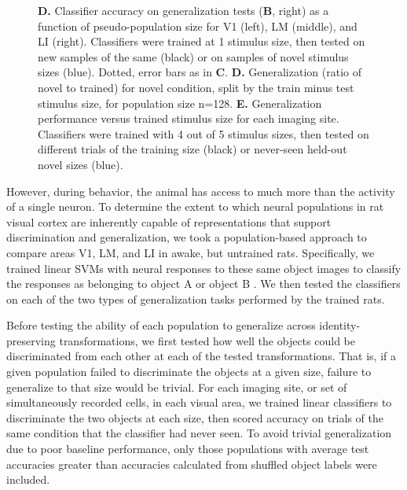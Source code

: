 \begin{figure}[t!]
{    \textbf{D.} Classifier accuracy on generalization tests (\textbf{B}, right) as a function of pseudo-population size for V1 (left), LM (middle), and LI (right). Classifiers were trained at 1 stimulus size, then tested on new samples of the same (black) or on samples of novel stimulus sizes (blue). Dotted, error bars as in \textbf{C}.
    \textbf{D.} Generalization (ratio of novel to trained) for novel condition, split by the train minus test stimulus size, for population size n=128.
    \textbf{E.} Generalization performance versus trained stimulus size for each imaging site. Classifiers were trained with 4 out of 5 stimulus sizes, then tested on different trials of the training size (black) or never-seen held-out novel sizes (blue).
    \label{fig:neural_generalization}}
\end{figure}


However, during behavior, the animal has access to much more than the activity of a single neuron. To determine the extent to which neural populations in rat visual cortex are inherently capable of representations that support discrimination and generalization, we took a population-based approach to compare areas V1, LM, and LI in awake, but untrained rats. Specifically, we trained linear SVMs with neural responses to these same object images to classify the responses as belonging to object A or object B \cite{Hung2005, Li2009, Rust2010}. We then tested the classifiers on each of the two types of generalization tasks performed by the trained rats. 

Before testing the ability of each population to generalize across identity-preserving transformations, we first tested how well the objects could be discriminated from each other at each of the tested transformations. That is, if a given population failed to discriminate the objects at a given size, failure to generalize to that size would be trivial. For each imaging site, or set of simultaneously recorded cells, in each visual area, we trained linear classifiers to discriminate the two objects at each size, then scored accuracy on trials of the same condition that the classifier had never seen. To avoid trivial generalization due to poor baseline performance, only those populations with average test accuracies greater than accuracies calculated from shuffled object labels were included. 

